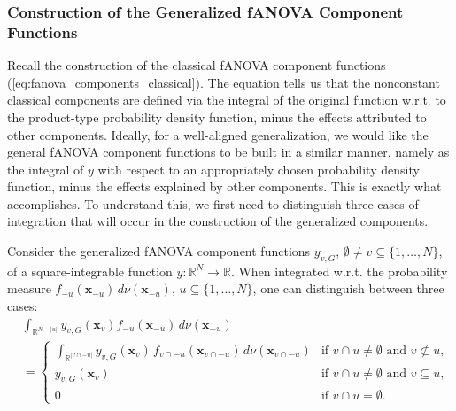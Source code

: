 \subsubsection{Construction of the Generalized fANOVA Component Functions}
Recall the construction of the classical fANOVA component functions (\autoref{eq:fanova_components_classical}). The equation tells us that the nonconstant classical components are defined via the integral of the original function w.r.t. to the product-type probability density function, minus the effects attributed to other components.
Ideally, for a well-aligned generalization, we would like the general fANOVA component functions 
to be built in a similar manner, namely as the integral of $y$ with respect to an 
appropriately chosen probability density function, minus the effects explained by other components. This is exactly what \cite{rahman2014} accomplishes.
To understand this, we first need to distinguish three cases of integration that will occur in the construction of the generalized components.
\begin{proposition}\label{prop:generalized_fanova_integration_cases}
Consider the generalized fANOVA component functions $y_{v,G}$, $\emptyset \ne v \subseteq \{1,\dots,N\}$, of a square-integrable function $y : \mathbb{R}^N \to \mathbb{R}$. When integrated w.r.t. the probability measure $f_{-u}(\boldsymbol{x}_{-u})\, d \nu(\boldsymbol{x}_{-u})$, $u \subseteq \{1,\dots,N\}$, one can distinguish between three cases:
\begin{equation}
\begin{aligned}
& \int_{\mathbb{R}^{N - |u|}} y_{v,G}(\boldsymbol{x}_v) 
    f_{-u}(\boldsymbol{x}_{-u}) \, d \nu(\boldsymbol{x}_{-u}) \\[0.5em]
&= 
\begin{cases}
    \displaystyle 
    \int_{\mathbb{R}^{|v \cap -u|}} 
        y_{v,G}(\boldsymbol{x}_v)\,
        f_{v \cap -u}(\boldsymbol{x}_{v \cap -u})\,
        d \nu(\boldsymbol{x}_{v \cap -u}) 
        & \text{if } v \cap u \ne \emptyset \text{ and } v \not\subset u, \\[1ex]
    y_{v,G}(\boldsymbol{x}_v) 
        & \text{if } v \cap u \ne \emptyset \text{ and } v \subseteq u, \\[1ex]
    0 
        & \text{if } v \cap u = \emptyset.
\end{cases}
\end{aligned}
\end{equation}
\end{proposition}
